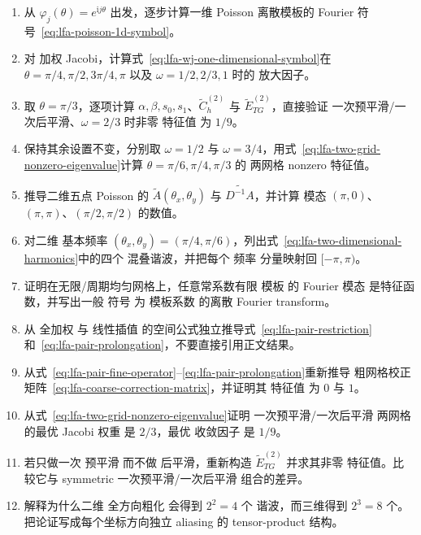 \begin{enumerate}[label=\arabic*.]
\item 从 $\varphi_j(\theta)=e^{\mathrm i j\theta}$ 出发，逐步计算一维 Poisson 离散模板的 Fourier 符号~\eqref{eq:lfa-poisson-1d-symbol}。

\item 对 加权 Jacobi，计算式~\eqref{eq:lfa-wj-one-dimensional-symbol}在 $\theta=\pi/4,\pi/2,3\pi/4,\pi$ 以及 $\omega=1/2,2/3,1$ 时的 放大因子。

\item 取 $\theta=\pi/3$，逐项计算 $\alpha,\beta,s_0,s_1$、$\widetilde C_h^{(2)}$ 与 $\widetilde E_{TG}^{(2)}$，直接验证 一次预平滑/一次后平滑、$\omega=2/3$ 时非零 特征值 为 $1/9$。

\item 保持其余设置不变，分别取 $\omega=1/2$ 与 $\omega=3/4$，用式~\eqref{eq:lfa-two-grid-nonzero-eigenvalue}计算 $\theta=\pi/6,\pi/4,\pi/3$ 的 两网格 nonzero 特征值。

\item 推导二维五点 Poisson 的 $\widetilde A(\theta_x,\theta_y)$ 与 $\widetilde{D^{-1}A}$，并计算 模态 $(\pi,0)$、$(\pi,\pi)$、$(\pi/2,\pi/2)$ 的数值。

\item 对二维 基本频率 $(\theta_x,\theta_y)=(\pi/4,\pi/6)$，列出式~\eqref{eq:lfa-two-dimensional-harmonics}中的四个 混叠谐波，并把每个 频率 分量映射回 $[-\pi,\pi)$。

\item 证明在无限/周期均匀网格上，任意常系数有限 模板 的 Fourier 模态 是特征函数，并写出一般 符号 为 模板系数 的离散 Fourier transform。

\item 从 全加权 与 线性插值 的空间公式独立推导式~\eqref{eq:lfa-pair-restriction}和~\eqref{eq:lfa-pair-prolongation}，不要直接引用正文结果。

\item 从式~\eqref{eq:lfa-pair-fine-operator}--\eqref{eq:lfa-pair-prolongation}重新推导 粗网格校正矩阵~\eqref{eq:lfa-coarse-correction-matrix}，并证明其 特征值 为 $0$ 与 $1$。

\item 从式~\eqref{eq:lfa-two-grid-nonzero-eigenvalue}证明 一次预平滑/一次后平滑 两网格 的最优 Jacobi 权重 是 $2/3$，最优 收敛因子 是 $1/9$。

\item 若只做一次 预平滑 而不做 后平滑，重新构造 $\widetilde E_{TG}^{(2)}$ 并求其非零 特征值。比较它与 symmetric 一次预平滑/一次后平滑 组合的差异。

\item 解释为什么二维 全方向粗化 会得到 $2^2=4$ 个 谐波，而三维得到 $2^3=8$ 个。把论证写成每个坐标方向独立 aliasing 的 tensor-product 结构。
\end{enumerate}

